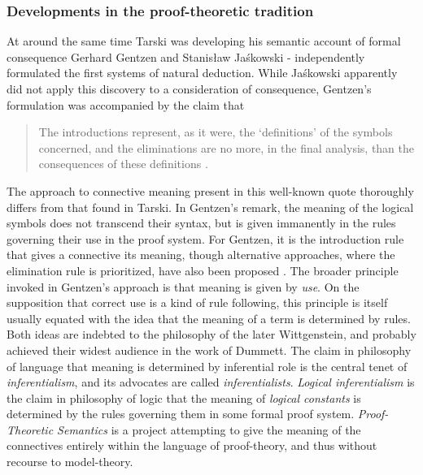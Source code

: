 \documentclass[]{article}
\begin{document}
\subsubsection{Developments in the proof-theoretic tradition}
At around the same time Tarski was developing his semantic account of formal consequence Gerhard Gentzen and Stanis\l{}aw Ja\'{s}kowski - independently formulated the first systems of natural deduction. While Ja\'{s}kowski apparently did not apply this discovery to a consideration of consequence, Gentzen's formulation was accompanied by the claim that
\begin{quote}
The introductions represent, as it were, the `definitions' of the symbols concerned, and the eliminations are no more, in the final analysis, than the consequences of these definitions \cite[80]{Gentzen1934Eng}.
\end{quote}

The approach to connective meaning present in this well-known quote thoroughly differs from that found in Tarski. In Gentzen's remark, the meaning of the logical symbols does not transcend their syntax, but is given immanently in the rules governing their use in the proof system. For Gentzen, it is the introduction rule that gives a connective its meaning, though alternative approaches, where the elimination rule is prioritized, have also been proposed \cite[186]{Schroeder-Heister2014}. The broader principle invoked in Gentzen's approach is that meaning is given by \textit{use}. On the supposition that correct use is a kind of rule following, this principle is itself usually equated with the idea that the meaning of a term is determined by rules. Both ideas are indebted to the philosophy of the later Wittgenstein, and probably achieved their widest audience in the work of Dummett. The claim in philosophy of language that meaning is determined by inferential role is the central tenet of \textit{inferentialism}, and its advocates are called \textit{inferentialists}. \textit{Logical inferentialism} is the claim in philosophy of logic that the meaning of \textit{logical constants} is determined by the rules governing them in some formal proof system. \textit{Proof-Theoretic Semantics} is a project attempting to give the meaning of the connectives entirely within the language of proof-theory, and thus without recourse to model-theory.
\end{document}
